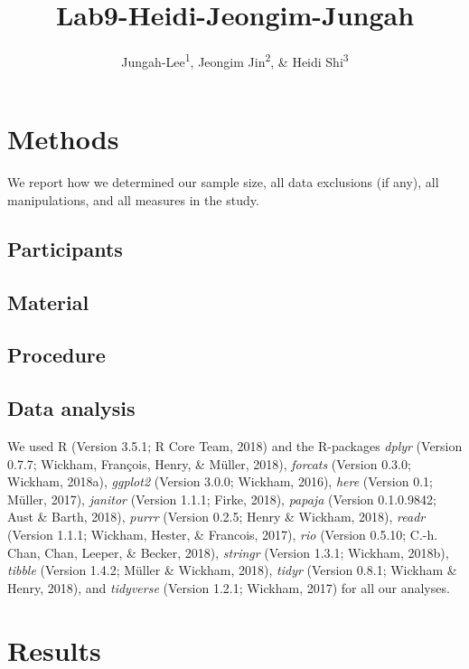 \documentclass[man]{apa6}
\title{Lab9-Heidi-Jeongim-Jungah}
\author{Jungah-Lee\textsuperscript{1}, Jeongim Jin\textsuperscript{2}, \& Heidi
Shi\textsuperscript{3}}
\date{}
\affiliation{
\vspace{0.5cm}
\textsuperscript{1} University of Oregon\\\textsuperscript{2} University of Oregon\\\textsuperscript{3} University of Oregon}
\begin{document}
\maketitle

\section{Methods}\label{methods}

We report how we determined our sample size, all data exclusions (if
any), all manipulations, and all measures in the study.

\subsection{Participants}\label{participants}

\subsection{Material}\label{material}

\subsection{Procedure}\label{procedure}

\subsection{Data analysis}\label{data-analysis}

We used R (Version 3.5.1; R Core Team, 2018) and the R-packages
\emph{dplyr} (Version 0.7.7; Wickham, François, Henry, \& Müller, 2018),
\emph{forcats} (Version 0.3.0; Wickham, 2018a), \emph{ggplot2} (Version
3.0.0; Wickham, 2016), \emph{here} (Version 0.1; Müller, 2017),
\emph{janitor} (Version 1.1.1; Firke, 2018), \emph{papaja} (Version
0.1.0.9842; Aust \& Barth, 2018), \emph{purrr} (Version 0.2.5; Henry \&
Wickham, 2018), \emph{readr} (Version 1.1.1; Wickham, Hester, \&
Francois, 2017), \emph{rio} (Version 0.5.10; C.-h. Chan, Chan, Leeper,
\& Becker, 2018), \emph{stringr} (Version 1.3.1; Wickham, 2018b),
\emph{tibble} (Version 1.4.2; Müller \& Wickham, 2018), \emph{tidyr}
(Version 0.8.1; Wickham \& Henry, 2018), and \emph{tidyverse} (Version
1.2.1; Wickham, 2017) for all our analyses.

\section{Results}\label{results}
\end{document}
